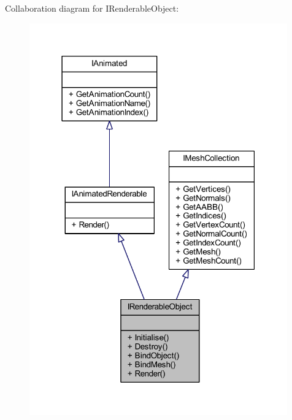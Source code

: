 Collaboration diagram for I\+Renderable\+Object\+:
\nopagebreak
\begin{figure}[H]
\begin{center}
\leavevmode
\includegraphics[width=315pt]{class_i_renderable_object__coll__graph}
\end{center}
\end{figure}
